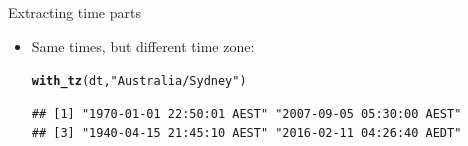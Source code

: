 \documentclass[unknownkeysallowed]{beamer}\usepackage[]{graphicx}\usepackage[]{color}
\makeatletter
\newcommand{\hlstr}[1]{\textcolor[rgb]{0.192,0.494,0.8}{#1}}%
\newcommand{\hlstd}[1]{\textcolor[rgb]{0.345,0.345,0.345}{#1}}%
\newcommand{\hlkwd}[1]{\textcolor[rgb]{0.737,0.353,0.396}{\textbf{#1}}}%
\newenvironment{kframe}{%
 \def\at@end@of@kframe{}%
 \ifinner\ifhmode%
  \def\at@end@of@kframe{\end{minipage}}%
  \begin{minipage}{\columnwidth}%
 \fi\fi%
 \def\FrameCommand##1{\hskip\@totalleftmargin \hskip-\fboxsep
 \colorbox{shadecolor}{##1}\hskip-\fboxsep
     \hskip-\linewidth \hskip-\@totalleftmargin \hskip\columnwidth}%
 \MakeFramed {\advance\hsize-\width
   \@totalleftmargin\z@ \linewidth\hsize
   \@setminipage}}%
 {\par\unskip\endMakeFramed%
 \at@end@of@kframe}
\newenvironment{knitrout}{}{} %
\makeatother
\begin{document}
\begin{frame}[fragile]{Extracting time parts}
\begin{itemize}
\begin{small}
\begin{multicols}{2}
\end{multicols}


    \end{small}
\item Same times, but different time zone:
  \begin{small}
\begin{knitrout}
\color{fgcolor}\begin{kframe}
\begin{alltt}
\hlkwd{with_tz}\hlstd{(dt,}\hlstr{"Australia/Sydney"}\hlstd{)}
\end{alltt}
\begin{verbatim}
## [1] "1970-01-01 22:50:01 AEST" "2007-09-05 05:30:00 AEST"
## [3] "1940-04-15 21:45:10 AEST" "2016-02-11 04:26:40 AEDT"
\end{verbatim}
\end{kframe}
\end{knitrout}
  \end{small}
  \end{itemize}
  
\end{frame}
\end{document}
